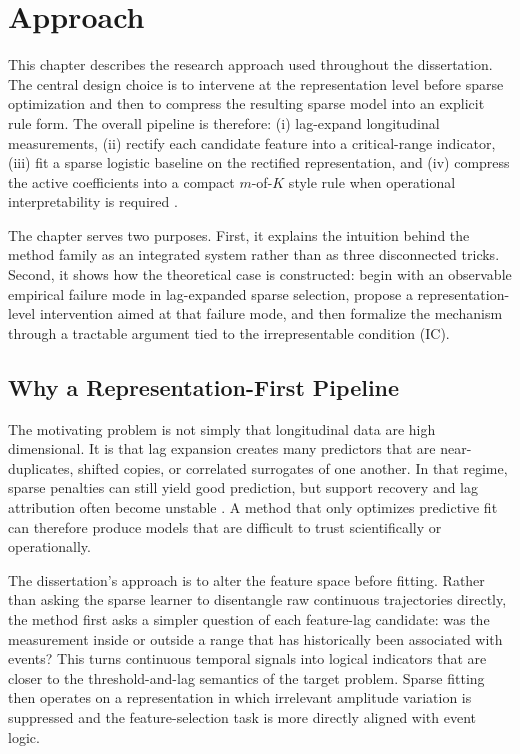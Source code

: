 
\chapter{Approach}

This chapter describes the research approach used throughout the dissertation. The central design choice is to intervene at the representation level before sparse optimization and then to compress the resulting sparse model into an explicit rule form. The overall pipeline is therefore: (i) lag-expand longitudinal measurements, (ii) rectify each candidate feature into a critical-range indicator, (iii) fit a sparse logistic baseline on the rectified representation, and (iv) compress the active coefficients into a compact $m$-of-$K$ style rule when operational interpretability is required \autocites{orender2022,JOrender2025Efficient,JOrender2025Anytime}.

The chapter serves two purposes. First, it explains the intuition behind the method family as an integrated system rather than as three disconnected tricks. Second, it shows how the theoretical case is constructed: begin with an observable empirical failure mode in lag-expanded sparse selection, propose a representation-level intervention aimed at that failure mode, and then formalize the mechanism through a tractable argument tied to the irrepresentable condition (IC).

\section{Why a Representation-First Pipeline}

The motivating problem is not simply that longitudinal data are high dimensional. It is that lag expansion creates many predictors that are near-duplicates, shifted copies, or correlated surrogates of one another. In that regime, sparse penalties can still yield good prediction, but support recovery and lag attribution often become unstable \autocites{PZhao2006model,freijeirogonzalez2022}. A method that only optimizes predictive fit can therefore produce models that are difficult to trust scientifically or operationally.

The dissertation's approach is to alter the feature space before fitting. Rather than asking the sparse learner to disentangle raw continuous trajectories directly, the method first asks a simpler question of each feature-lag candidate: was the measurement inside or outside a range that has historically been associated with events? This turns continuous temporal signals into logical indicators that are closer to the threshold-and-lag semantics of the target problem. Sparse fitting then operates on a representation in which irrelevant amplitude variation is suppressed and the feature-selection task is more directly aligned with event logic.

